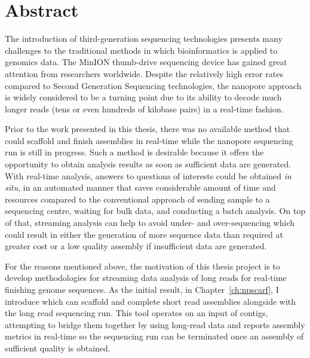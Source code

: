 \chapter*{Abstract}
The introduction of third-generation sequencing technologies presents many challenges to the traditional methods in which bioinformatics is applied to genomics data. The MinION thumb-drive sequencing device has gained great attention from researchers worldwide. Despite the relatively high error rates compared to Second Generation Sequencing technologies, the nanopore approach is widely considered to be a turning point due to its ability to decode much longer reads (tens or even hundreds of kilobase pairs) in a real-time fashion.

Prior to the work presented in this thesis, there was no available method that could scaffold and finish assemblies in real-time while the nanopore sequencing run is still in progress. Such a method is desirable because it offers the opportunity to obtain analysis results as soon as sufficient data are generated.
With real-time analysis, answers to questions of interests
could be obtained \emph{in situ}, in an automated manner that saves considerable amount of time and resources compared to the conventional approach of sending sample to a sequencing centre, waiting for bulk data, and conducting a batch analysis. 
On top of that, streaming analysis can help to avoid under- and over-sequencing which could result in either the generation of more sequence data than required at greater cost or a low quality assembly if insufficient data are generated.

For the reasons mentioned above, the motivation of this thesis project is to develop methodologies for streaming data analysis of long reads for real-time finishing genome sequences.
As the initial result, in Chapter~\ref{ch:npscarf}, I introduce \npscarf{} which can scaffold and complete short read assemblies alongside with the long read sequencing run. This tool operates on an input of contigs, attempting to bridge them together by using long-read data and reports assembly metrics in real-time so the sequencing run can be terminated once an assembly of sufficient quality is obtained.

